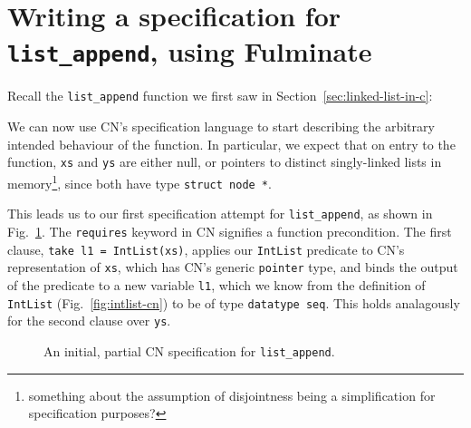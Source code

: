 
\section{Writing a specification for \texttt{list\_append}, using Fulminate}

Recall the \texttt{list\_append} function we first saw in Section~\ref{sec:linked-list-in-c}:

\begin{figure}[h]
    \begin{center}
    
    \vspace{-1em}
    \end{center}
\end{figure}


We can now use CN's specification language to start describing the arbitrary intended behaviour of the function. In particular, we expect that on entry to the function, \texttt{xs} and \texttt{ys} are either null, or pointers to distinct singly-linked lists in memory\footnote{something about the assumption of disjointness being a simplification for specification purposes?}, since both have type \texttt{struct node *}.

This leads us to our first specification attempt for \texttt{list\_append}, as shown in Fig.~\ref{fig:partial-cn-spec}. The \texttt{requires} keyword in CN signifies a function precondition. The first clause, \texttt{take l1 = IntList(xs)}, applies our \texttt{IntList} predicate to CN's representation of \texttt{xs}, which has CN's generic \texttt{pointer} type, and binds the output of the predicate to a new variable \texttt{l1}, which we know from the definition of \texttt{IntList} (Fig.~\ref{fig:intlist-cn}) to be of type \texttt{datatype seq}. This holds analagously for the second clause over \texttt{ys}.

\begin{figure}[h]
    \begin{center}
    
    \vspace{-1em}
    \end{center}
    \caption{An initial, partial CN specification for \texttt{list\_append}.}
    \label{fig:partial-cn-spec}
\end{figure}

